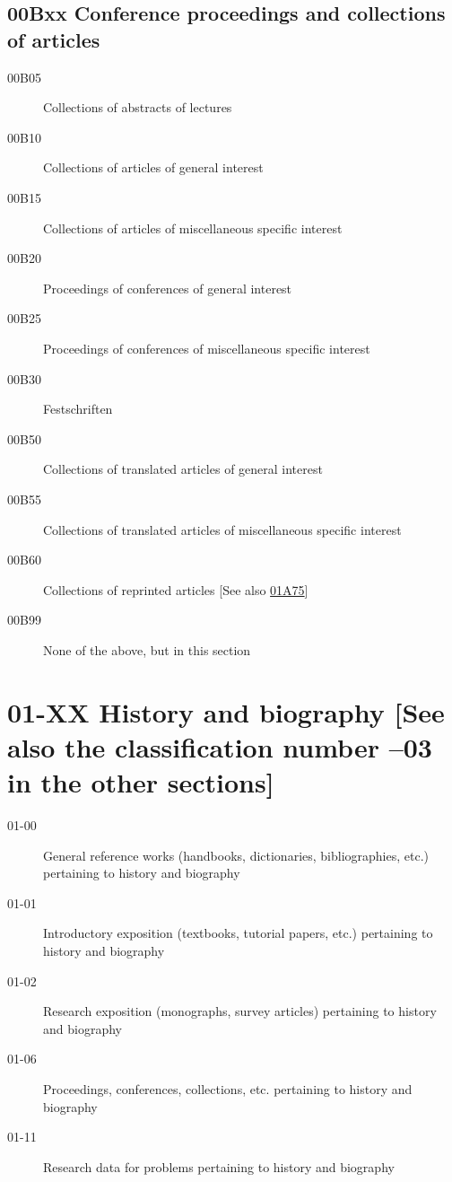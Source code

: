 \documentclass[letterpaper]{article}
\begin{document}
\subsection*{00Bxx  Conference proceedings and collections of articles }\label{00Bxx}
\begin{description} 
\item [00B05]\label{00B05} Collections of abstracts of lectures
\item [00B10]\label{00B10} Collections of articles of general interest
\item [00B15]\label{00B15} Collections of articles of miscellaneous specific interest
\item [00B20]\label{00B20} Proceedings of conferences of general interest
\item [00B25]\label{00B25} Proceedings of conferences of miscellaneous specific interest
\item [00B30]\label{00B30} Festschriften
\item [00B50]\label{00B50} Collections of translated articles of general interest
\item [00B55]\label{00B55} Collections of translated articles of miscellaneous specific interest
\item [00B60]\label{00B60} Collections of reprinted articles [See also \hyperref[01A75]{01A75}]
\item [00B99]\label{00B99} None of the above, but in this section
\end{description}
\section*{01-XX History and biography [See also the  classification number --03 in the other sections] }\label{01-XX}
\begin{description}
\item [01-00]\label{01-00} General reference works (handbooks, dictionaries, bibliographies, etc.) pertaining to history and biography
\item [01-01]\label{01-01} Introductory exposition (textbooks, tutorial papers, etc.) pertaining to history and biography
\item [01-02]\label{01-02} Research exposition (monographs, survey articles) pertaining to history and biography
\item [01-06]\label{01-06} Proceedings, conferences, collections, etc. pertaining to history and biography
\item [01-11]\label{01-11} Research data for problems pertaining to history and biography  
\end{description}
\end{document}

